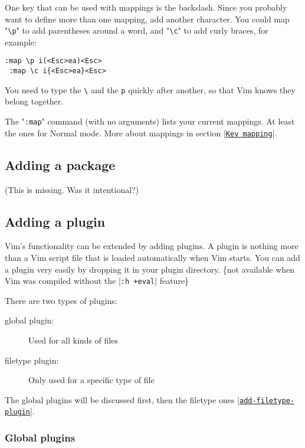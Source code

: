 One key that can be used with mappings is the backslash.
Since you probably want to define more than one mapping, add another character.
You could map "\verb!\p!" to add parentheses around a word, and "\verb!\c!" to add curly braces, for example:

 \begin{Verbatim}[samepage=true]
 :map \p i(<Esc>ea)<Esc>
 :map \c i{<Esc>ea}<Esc>
 \end{Verbatim}

You need to type the \verb!\! and the \verb!p! quickly after another, so that Vim knows they belong together.

The "\verb!:map!" command (with no arguments) lists your current mappings.
At least the ones for Normal mode.
More about mappings in section |\hyperref[Key mapping]{\texttt{Key mapping}}|.

\subsection{Adding a package}
(This is missing.  Was it intentional?)

\subsection{Adding a plugin}
\label{add-plugin}
\label{plugin}

Vim's functionality can be extended by adding plugins.
A plugin is nothing more than a Vim script file that is loaded automatically when Vim starts.
You can add a plugin very easily by dropping it in your plugin directory.
\{not available when Vim was compiled without the |\verb!:h +eval!| feature\}

There are two types of plugins:
\begin{description}
				\item [global plugin:] Used for all kinds of files
				\item [filetype plugin:] Only used for a specific type of file
\end{description}

The global plugins will be discussed first, then the filetype ones \hyperref[add-filetype-plugin]{|\texttt{add-filetype-plugin}|}.

\subsubsection{Global plugins}
\label{standard-plugin}

